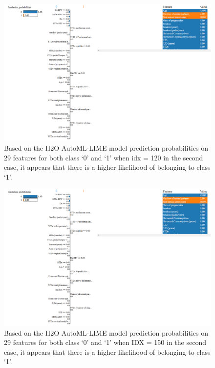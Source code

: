 \documentclass{llncs}
\begin{document}
\begin{figure}[htbp]
	\centering
	\includegraphics[width=1\textwidth]{images/result1}
	\caption{Based on the H2O AutoML-LIME model prediction probabilities on 29 features for both class ‘0’ and ‘1’ when idx = 120 in the second case, it appears that there is a higher likelihood of belonging to class ‘1’.}
	\label{fig:IDX120}
\end{figure}

\begin{figure}[htbp]
	\centering
	\includegraphics[width=1\textwidth]{images/result1}
	\caption{Based on the H2O AutoML-LIME model prediction probabilities on 29 features for both class ‘0’ and ‘1’ when IDX = 150 in the second case, it appears that there is a higher likelihood of belonging to class ‘1’.}
	\label{fig:IDX150}
\end{figure}
\end{document}
